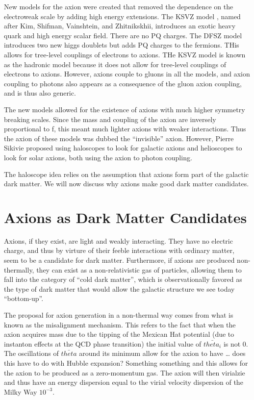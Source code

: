 \documentclass[11pt]{book}
\begin{document}
New models for the axion were created that removed the dependence on the electroweak scale by adding high energy extensions. The KSVZ model \cite{ksvz}, named after Kim, Shifman, Vainshtein, and Zhitnikskhii, introduces an exotic heavy quark and high energy scalar field. There are no PQ charges. The DFSZ model \cite{dfsz} introduces two new higgs doublets but adds PQ charges to the fermions. THis allows for tree-level couplings of electrons to axions. THe KSVZ model is known as the hadronic model because it does not allow for tree-level couplings of electrons to axions. However, axions couple to gluons in all the models, and axion coupling to photons also appears as a consequence of the gluon axion coupling, and is thus also generic. 

The new models allowed for the existence of axions with much higher symmetry breaking scales. Since the mass and coupling of the axion are inversely proportional to f, this meant much lighter axions with weaker interactions. Thus the axion of these models was dubbed the “invisible” axion. However, Pierre Sikivie \cite{sikivie} proposed using haloscopes to look for galactic axions and helioscopes to look for solar axions, both using the axion to photon coupling.

The haloscope idea relies on the assumption that axions form part of the galactic dark matter. We will now discuss why axions make good dark matter candidates.

\section{Axions as Dark Matter Candidates}

Axions, if they exist, are light and weakly interacting. They have no electric charge, and thus by virture of their feeble interactions with ordinary matter, seem to be a candidate for dark matter. Furthermore, if axions are produced non-thermally, they can exist as a non-relativistic gas of particles, allowing them to fall into the category of “cold dark matter”, which is observationally favored as the type of dark matter that would allow the galactic structure we see today “bottom-up”.

The proposal for axion generation in a non-thermal way comes from what is known as the misalignment mechanism. This refers to the fact that when the axion acquires mass due to the tipping of the Mexican Hat potential (due to instanton effects at the QCD phase transition) the initial value of $\bar{theta_i}$ is not 0. The oscillations of $\bar{theta}$ around its minimum allow for the axion to have … does this have to do with Hubble expansion? Something something and this allows for the axion to be produced as a zero-momentum gas. The axion will then virialzie and thus have an energy dispersion equal to the virial velocity dispersion of the Milky Way $10^{-3}$. 
\end{document}
